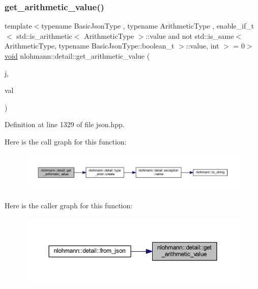 \subsubsection{\texorpdfstring{get\_arithmetic\_value()}{get\_arithmetic\_value()}}
{\footnotesize\ttfamily template$<$typename Basic\+Json\+Type , typename Arithmetic\+Type , enable\+\_\+if\+\_\+t$<$ std\+::is\+\_\+arithmetic$<$ Arithmetic\+Type $>$\+::value and not std\+::is\+\_\+same$<$ Arithmetic\+Type, typename Basic\+Json\+Type\+::boolean\+\_\+t $>$\+::value, int $>$  = 0$>$ \\
\mbox{\hyperlink{namespacenlohmann_1_1detail_a59fca69799f6b9e366710cb9043aa77d}{void}} nlohmann\+::detail\+::get\+\_\+arithmetic\+\_\+value (\begin{DoxyParamCaption}\item[{const Basic\+Json\+Type \&}]{j,  }\item[{Arithmetic\+Type \&}]{val }\end{DoxyParamCaption})}



Definition at line 1329 of file json.\+hpp.

Here is the call graph for this function\+:
\nopagebreak
\begin{figure}[H]
\begin{center}
\leavevmode
\includegraphics[width=350pt]{namespacenlohmann_1_1detail_a85955b9c6dd31846e4b8e891f78614b6_cgraph}
\end{center}
\end{figure}
Here is the caller graph for this function\+:
\nopagebreak
\begin{figure}[H]
\begin{center}
\leavevmode
\includegraphics[width=350pt]{namespacenlohmann_1_1detail_a85955b9c6dd31846e4b8e891f78614b6_icgraph}
\end{center}
\end{figure}
\mbox{\label{namespacenlohmann_1_1detail_a09169efff3bd1771fff29bd92cea19e0}} 
